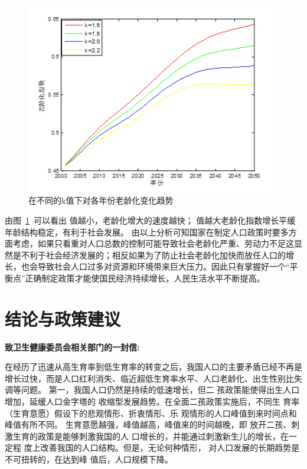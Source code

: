 \documentclass{whutmod}
\begin{document}
\begin{figure}[H]
	\centering
	\includegraphics[width=\textwidth]{figures/ad.png}
	\caption{在不同的k值下对各年份老龄化变化趋势}\label{lsssdsasct}
\end{figure}

由图~\ref{lsssdsasct}~可以看出 值越小，老龄化增大的速度越快； 值越大老龄化指数增长平缓年龄结构稳定，有利于社会发展。
由以上分析可知国家在制定人口政策时要多方面考虑，如果只看重对人口总数的控制可能导致社会老龄化严重、劳动力不足这显然是不利于社会经济发展的；相反如果为了防止社会老龄化加快而放任人口的增长，也会导致社会人口过多对资源和环境带来巨大压力。因此只有掌握好一个“平衡点”正确制定政策才能使国民经济持续增长，人民生活水平不断提高。


    \section{结论与政策建议}
\textbf{    致卫生健康委员会相关部门的一封信:}
    
    
        在经历了迅速从高生育率到低生育率的转变之后，我国人口的主要矛盾已经不再是增长过快，而是人口红利消失、临近超低生育率水平、人口老龄化、出生性别比失调等问题。
        第一，我国人口仍然是持续的低速增长，但二
        孩政策能使得出生人口增加，延缓人口金字塔的
        收缩型发展趋势。在全面二孩政策实施后，不同生
        育率（生育意愿）假设下的悲观情形、折衷情形、乐
        观情形的人口峰值到来时间点和峰值有所不同。
        生育意愿越强，峰值越高，峰值来的时间越晚，即
        放开二孩、刺激生育的政策是能够刺激我国的人
        口增长的，并能通过刺激新生儿的增长，在一定程
        度上改善我国的人口结构。但是，无论何种情形，
        对人口发展的长期趋势是不可扭转的，在达到峰
        值后，人口规模下降。
        
\end{document}
